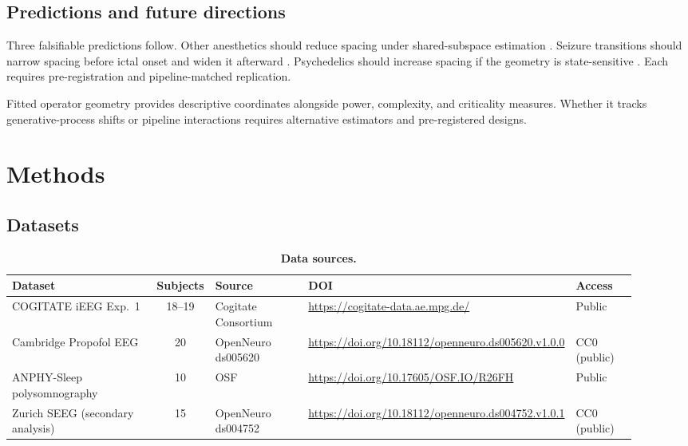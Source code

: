 \documentclass[preprint,12pt,nonatbib]{elsarticle}
\begin{document}
\subsection{Predictions and future directions}
Three falsifiable predictions follow. Other anesthetics should reduce spacing under shared-subspace estimation \citep{Eisen2026}. Seizure transitions should narrow spacing before ictal onset and widen it afterward \citep{Moosavi2025,Grubov2025}. Psychedelics should increase spacing if the geometry is state-sensitive \citep{McCulloch2023,Larsen2026,Cardone2024}. Each requires pre-registration and pipeline-matched replication.

Fitted operator geometry provides descriptive coordinates alongside power, complexity, and criticality measures. Whether it tracks generative-process shifts or pipeline interactions requires alternative estimators and pre-registered designs.


\section{Methods}

\subsection{Datasets}

\begin{table}[t]
\centering
\caption{\textbf{Data sources.}}
\label{tab:datasources}
\setlength{\tabcolsep}{4pt}
\renewcommand{\arraystretch}{1.15}
\scriptsize
\begin{tabular}{@{}p{0.33\linewidth} c p{0.20\linewidth} p{0.26\linewidth} p{0.12\linewidth}@{}}
\toprule
Dataset & Subjects & Source & DOI & Access \\
\midrule
COGITATE iEEG Exp.~1 & 18--19 & Cogitate Consortium & \url{https://cogitate-data.ae.mpg.de/} & Public \\
Cambridge Propofol EEG & 20 & OpenNeuro ds005620 & \url{https://doi.org/10.18112/openneuro.ds005620.v1.0.0} & CC0 (public) \\
ANPHY-Sleep polysomnography & 10 & OSF & \url{https://doi.org/10.17605/OSF.IO/R26FH} & Public \\
Zurich SEEG (secondary analysis) & 15 & OpenNeuro ds004752 & \url{https://doi.org/10.18112/openneuro.ds004752.v1.0.1} & CC0 (public) \\
\bottomrule
\end{tabular}
\end{table}
\end{document}
